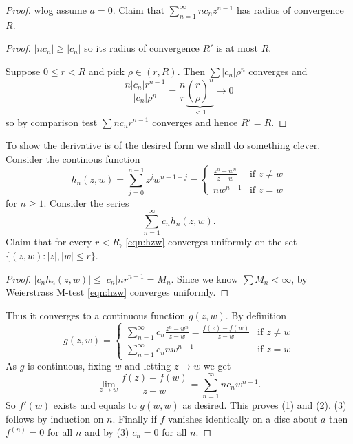 \documentclass[a4paper]{article}
\begin{document}
\begin{proof}
  wlog assume \(a = 0\). Claim that \(\sum_{n = 1}^\infty nc_nz^{n - 1}\) has radius of convergence \(R\).

  \begin{proof}
    \(|nc_n| \geq |c_n|\) so its radius of convergence \(R'\) is at most \(R\).

    Suppose \(0 \leq r < R\) and pick \(\rho \in (r, R)\). Then \(\sum |c_n|\rho^n\) converges and
    \[
      \frac{n|c_n|r^{n - 1}}{|c_n|\rho^n} = \frac{n}{r}\underbrace{\left(\frac{r}{\rho}\right)^n}_{< 1} \to 0
    \]
    so by comparison test \(\sum nc_nr^{n - 1}\) converges and hence \(R' = R\).
  \end{proof}

  To show the derivative is of the desired form we shall do something clever. Consider the continous function
  \[
    h_n(z, w) = \sum_{j = 0}^{n - 1} z^j w^{n - 1 - j} =
    \begin{cases}
      \frac{z^n - w^n}{z - w} & \text{if } z \neq w \\
      nw^{n - 1} & \text{if } z = w
    \end{cases}
  \]
  for \(n \geq 1\). Consider the series
  \begin{equation}
    \label{eqn:hzw}
    \sum_{n = 1}^\infty c_nh_n(z, w).
    \tag{\(\ast\)}
  \end{equation}
  Claim that for every \(r < R\), \eqref{eqn:hzw} converges uniformly on the set \(\{(z, w): |z|, |w| \leq r\}\).

  \begin{proof}
    \(|c_nh_n(z, w)| \leq |c_n|nr^{n - 1} = M_n\). Since we know \(\sum M_n < \infty\), by Weierstrass M-test \eqref{eqn:hzw} converges uniformly.
  \end{proof}

  Thus it converges to a continuous function \(g(z, w)\). By definition
  \[
    g(z, w) =
    \begin{cases}
      \sum_{n = 1}^\infty c_n \frac{z^n - w^n}{z - w} = \frac{f(z) - f(w)}{z - w} & \text{if } z \neq w \\
      \sum_{n = 1}^\infty c_nnw^{n - 1} & \text{if } z = w
    \end{cases}
  \]
  As \(g\) is continuous, fixing \(w\) and letting \(z \to w\) we get
  \[
    \lim_{z \to w} \frac{f(z) - f(w)}{z - w} = \sum_{n = 1}^\infty nc_nw^{n - 1}.
  \]
  So \(f'(w)\) exists and equals to \(g(w, w)\) as desired. This proves (1) and (2). (3) follows by induction on \(n\). Finally if \(f\) vanishes identically on a disc about \(a\) then \(f^{(n)} = 0\) for all \(n\) and by (3) \(c_n = 0\) for all \(n\).
\end{proof}
\end{document}
